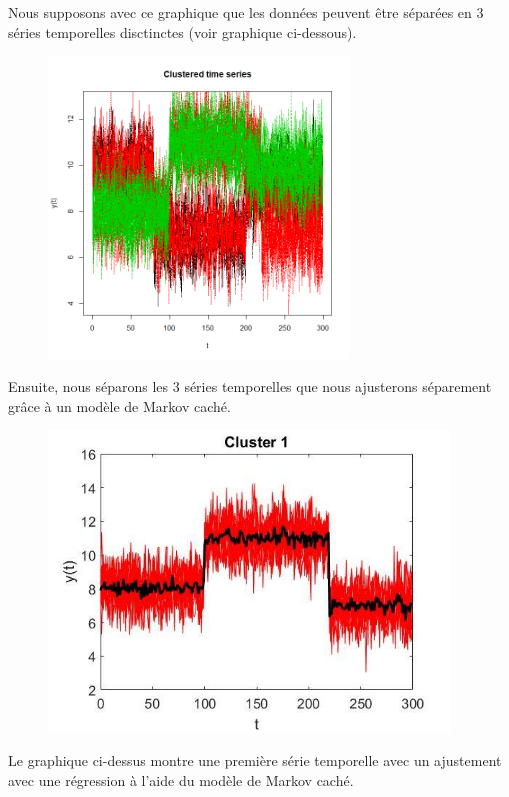 \documentclass[11pt]{article}
\begin{document}
Nous supposons avec ce graphique que les données peuvent être séparées en 3 séries temporelles disctinctes (voir graphique ci-dessous).\\

\begin{figure}[h]
\begin{center}
\includegraphics[height=8cm]{clustering.png}
\end{center}
\end{figure}

Ensuite, nous séparons les 3 séries temporelles que nous ajusterons séparement grâce à un modèle de Markov caché.

\begin{figure}[h]
\begin{center}
\includegraphics[height=8cm]{cl1.jpg}
\end{center}
\end{figure}

Le graphique ci-dessus montre une première série temporelle avec un ajustement avec une régression à l'aide du modèle de Markov caché.\\
\end{document}
